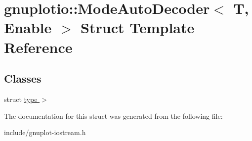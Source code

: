 \hypertarget{structgnuplotio_1_1ModeAutoDecoder}{}\section{gnuplotio\+:\+:Mode\+Auto\+Decoder$<$ T, Enable $>$ Struct Template Reference}
\label{structgnuplotio_1_1ModeAutoDecoder}
\subsection*{Classes}
\begin{DoxyCompactItemize}
\item 
struct \hyperlink{structgnuplotio_1_1ModeAutoDecoder_1_1type_01_4}{type $>$}
\end{DoxyCompactItemize}


The documentation for this struct was generated from the following file\+:\begin{DoxyCompactItemize}
\item 
include/gnuplot-\/iostream.\+h\end{DoxyCompactItemize}
